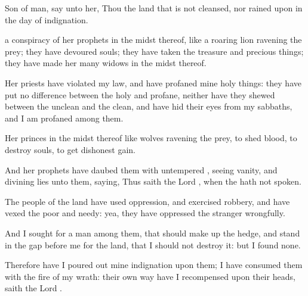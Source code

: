 {Son of
man,
say unto her, Thou
{} the
land that is not
cleansed, nor
rained upon in the
day of
indignation.

 a
conspiracy of her
prophets in the
midst thereof, like a
roaring
lion
ravening the
prey; they have
devoured
souls; they have
taken the
treasure and precious
things; they have made her
many
widows in the
midst thereof.

Her
priests have
violated my
law, and have
profaned mine holy
things: they have put no
difference between the
holy and
profane, neither have they
shewed
{} between the
unclean and the
clean, and have
hid their
eyes from my
sabbaths, and I am
profaned
among them.

Her
princes in the
midst thereof
{} like
wolves
ravening the
prey, to
shed
blood,
{} to
destroy
souls, to
get dishonest
gain.

And her
prophets have
daubed them with
untempered
{},
seeing
vanity, and
divining
lies unto them,
saying, Thus
saith the
Lord
{}, when the
{} hath not
spoken.

The
people of the
land have used
oppression, and
exercised
robbery, and have
vexed the
poor and
needy: yea, they have
oppressed the
stranger
wrongfully.

And I
sought for a
man among them, that should make
up the
hedge, and
stand in the
gap
before me for the
land, that I should not
destroy it: but I
found none.

Therefore have I poured
out mine
indignation upon them; I have
consumed them with the
fire of my
wrath: their own
way have I
recompensed upon their
heads,
saith the
Lord
{}.




\par }
